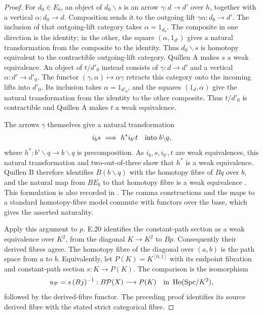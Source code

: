\begin{proof}
For $d_0\in E_b$, an object of $d_0\backslash s$ is an arrow $\gamma:d\to d'$ over $h$, together with a vertical $\alpha:d_0\to d$. Composition sends it to the outgoing lift $\gamma\alpha:d_0\to d'$. The inclusion of that outgoing-lift category takes $\alpha=1_{d_0}$. The composite in one direction is the identity; in the other, the square $(\alpha,1_{d'})$ gives a natural transformation from the composite to the identity. Thus $d_0\backslash s$ is homotopy equivalent to the contractible outgoing-lift category. Quillen A makes $s$ a weak equivalence. An object of $t/d'_0$ instead consists of $\gamma:d\to d'$ and a vertical $\alpha:d'\to d'_0$. The functor $(\gamma,\alpha)\mapsto\alpha\gamma$ retracts this category onto the incoming lifts into $d'_0$. Its inclusion takes $\alpha=1_{d'_0}$, and the squares $(1_d,\alpha)$ give the natural transformation from the identity to the other composite. Thus $t/d'_0$ is contractible and Quillen A makes $t$ a weak equivalence.

The arrows $\gamma$ themselves give a natural transformation
\[
             i_b s\ \Longrightarrow\ h^*i_{b'}t
             \quad\hbox{into }b\backslash q,
\]
where $h^*:b'\backslash q\to b\backslash q$ is precomposition. As $i_b,s,i_{b'},t$ are weak equivalences, this natural transformation and two-out-of-three show that $h^*$ is a weak equivalence. Quillen B therefore identifies $B(b\backslash q)$ with the homotopy fibre of $Bq$ over $b$, and the natural map from $BE_b$ to that homotopy fibre is a weak equivalence \citep[\S1, Theorems A and B]{Quillen1973}. This formulation is also recorded in \citet[Theorem 1.8]{Shoikhet2016}. The comma constructions and the maps to a standard homotopy-fibre model commute with functors over the base, which gives the asserted naturality.

Apply this argument to $p$. E.20 identifies the constant-path section as a weak equivalence over $K^2$, from the diagonal $K\to K^2$ to $Bp$. Consequently their derived fibres agree. The homotopy fibre of the diagonal over $(a,b)$ is the path space from $a$ to $b$. Equivalently, let $P(K)=K^{[0,1]}$ with its endpoint fibration and constant-path section $s:K\to P(K)$. The comparison is the isomorphism
\[
 u_{\mathcal P}=s\,(Bj)^{-1}:B\mathcal P(X)\longrightarrow P(K)
       \quad\hbox{in }\operatorname{Ho}(\mathrm{Spc}/K^2),
\]
followed by the derived-fibre functor. The preceding proof identifies its source derived fibre with the stated strict categorical fibre.
\end{proof}

